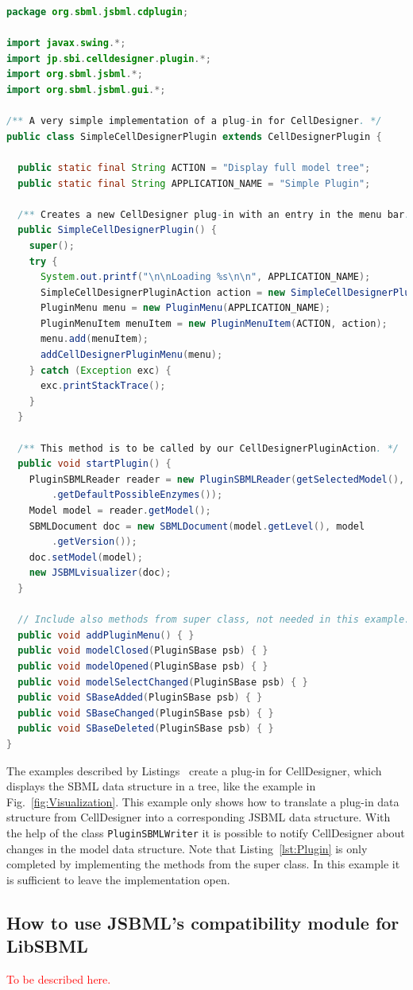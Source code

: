 \documentclass[
  BCOR12mm,
  letterpaper,
  11pt,
  headsepline,
  pointlessnumbers,
  tablecaptionabove,
  onelinecaption,
  headinclude,
  appendixprefix,
  idxtotoc,
  bibtotoc,
  twoside,
  titlepage
]{scrartcl}
\begin{document}
\begin{lstlisting}[language=Java,float,caption={A simple example for a
CellDesigner plug-in using JSBML as a communication layer},label=lst:Plugin]
package org.sbml.jsbml.cdplugin;

import javax.swing.*;
import jp.sbi.celldesigner.plugin.*;
import org.sbml.jsbml.*;
import org.sbml.jsbml.gui.*;

/** A very simple implementation of a plug-in for CellDesigner. */
public class SimpleCellDesignerPlugin extends CellDesignerPlugin {

  public static final String ACTION = "Display full model tree";
  public static final String APPLICATION_NAME = "Simple Plugin";

  /** Creates a new CellDesigner plug-in with an entry in the menu bar. */
  public SimpleCellDesignerPlugin() {
    super();
    try {
      System.out.printf("\n\nLoading %s\n\n", APPLICATION_NAME);
      SimpleCellDesignerPluginAction action = new SimpleCellDesignerPluginAction(this);
      PluginMenu menu = new PluginMenu(APPLICATION_NAME);
      PluginMenuItem menuItem = new PluginMenuItem(ACTION, action);
      menu.add(menuItem);
      addCellDesignerPluginMenu(menu);
    } catch (Exception exc) {
      exc.printStackTrace();
    }
  }

  /** This method is to be called by our CellDesignerPluginAction. */
  public void startPlugin() {
    PluginSBMLReader reader = new PluginSBMLReader(getSelectedModel(), SBO
        .getDefaultPossibleEnzymes());
    Model model = reader.getModel();
    SBMLDocument doc = new SBMLDocument(model.getLevel(), model
        .getVersion());
    doc.setModel(model);
    new JSBMLvisualizer(doc);
  }

  // Include also methods from super class, not needed in this example.
  public void addPluginMenu() { }
  public void modelClosed(PluginSBase psb) { }
  public void modelOpened(PluginSBase psb) { }
  public void modelSelectChanged(PluginSBase psb) { }
  public void SBaseAdded(PluginSBase psb) { }
  public void SBaseChanged(PluginSBase psb) { }
  public void SBaseDeleted(PluginSBase psb) { }
}
\end{lstlisting}
The examples described by Listings~
create a plug-in for CellDesigner, which displays the SBML data structure
in a tree, like the example in Fig.~\vref{fig:Visualization}. This example only
shows how to translate a plug-in data structure
from CellDesigner into a corresponding JSBML data structure. With the help of
the class \texttt{PluginSBMLWriter} it is possible to notify CellDesigner about
changes in the model data structure. Note that Listing~\vref{lst:Plugin} is only
completed by implementing the methods from the super class. In this example it
is sufficient to leave the implementation open.

\subsection{How to use JSBML's compatibility module for LibSBML}

\textcolor{red}{To be described here.}

\clearpage



\printindex
\end{document}
